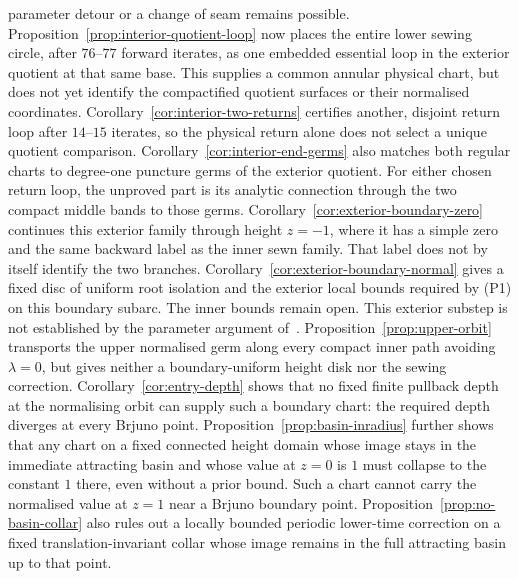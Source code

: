 \documentclass[11pt,a4paper]{article}
\theoremstyle{definition}
\begin{document}
parameter detour or a change of seam remains possible.
Proposition~\ref{prop:interior-quotient-loop} now places the entire
lower sewing circle, after $76$--$77$ forward iterates, as one
embedded essential loop in the exterior quotient at that same base.
This supplies a common annular physical chart, but does not yet
identify the compactified quotient surfaces or their normalised
coordinates.
Corollary~\ref{cor:interior-two-returns} certifies another,
disjoint return loop after $14$--$15$ iterates, so the physical
return alone does not select a unique quotient comparison.
Corollary~\ref{cor:interior-end-germs} also matches both regular
charts to degree-one puncture germs of the exterior quotient.
For either chosen return loop, the unproved part is its analytic
connection through the two compact middle bands to those germs.
Corollary~\ref{cor:exterior-boundary-zero} continues this exterior
family through height $z=-1$, where it has a simple zero and the
same backward label as the inner sewn family.  That label does not
by itself identify the two branches.
Corollary~\ref{cor:exterior-boundary-normal} gives a fixed disc of
uniform root isolation and the exterior local bounds required by
(P1) on this boundary subarc.  The inner bounds remain open.
This exterior substep is not established by the parameter argument
of~\cite[Prop.~3 and \S5]{Paulsen2019}.
Proposition~\ref{prop:upper-orbit} transports the upper normalised germ
along every compact inner path avoiding $\lambda=0$,
but gives neither a boundary-uniform height disk nor the sewing correction.
Corollary~\ref{cor:entry-depth} shows that no fixed finite pullback depth
at the normalising orbit can supply such a boundary chart: the required
depth diverges at every Brjuno point.
Proposition~\ref{prop:basin-inradius} further shows that any chart on a
fixed connected height domain whose image stays in the immediate
attracting basin and whose value at $z=0$ is $1$ must collapse to the
constant $1$ there, even without a prior bound.  Such a chart cannot
carry the normalised value at $z=1$ near a Brjuno boundary point.
Proposition~\ref{prop:no-basin-collar} also rules out a locally bounded
periodic lower-time correction on a fixed translation-invariant
collar whose image remains in the full attracting basin up to that point.
\end{document}
